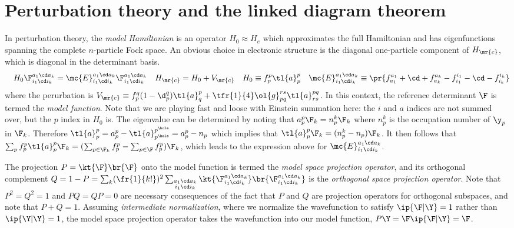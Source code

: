 \documentclass[11pt,fleqn]{article}
\numberwithin{equation}{section}
\begin{document}
\section{Perturbation theory and the linked diagram theorem}\label{sec:rspt}

\begin{dfn}\label{dfn:model-hamiltonian}
In perturbation theory, the \textit{model Hamiltonian} is an operator $H_0\approx H_e$ which approximates the full Hamiltonian and has eigenfunctions spanning the complete $n$-particle Fock space.
An obvious choice in electronic structure is the diagonal one-particle component of $H_\mr{c}$, which is diagonal in the determinant basis.
\begin{align*}
&&
  H_0
  \F_{i_1\cd i_k}^{a_1\cd a_k}
=
  \mc{E}_{i_1\cd i_k}^{a_1\cd a_k}
  \F_{i_1\cd i_k}^{a_1\cd a_k}
&&
  H_\mr{c}
=
  H_0
+
  V_\mr{c}
&&
  H_0
\equiv
  f_p^p\tl{a}^p_p
&&
  \mc{E}_{i_1\cd i_k}^{a_1\cd a_k}
\equiv
\pr{
  f_{a_1}^{a_1}
+
  \cd
+
  f_{a_k}^{a_k}
-
  f_{i_1}^{i_1}
-
  \cd
-
  f_{i_k}^{i_k}
}
\end{align*}
where the perurbation is
$
  V_\mr{c}
\equiv
  f_p^q(1-\d_p^q)
  \tl{a}^p_q
+
  \tfr{1}{4}
  \ol{g}_{pq}^{rs}
  \tl{a}^{pq}_{rs}
$.
In this context, the reference determinant $\F$ is termed the \textit{model function}.
Note that we are playing fast and loose with Einstein summation here: the $i$ and $a$ indices are not summed over, but the $p$ index in $H_0$ is.
The eigenvalue can be determined by noting that $a^p_p\F_k=n_p^k\F_k$ where $n_p^k$ is the occupation number of $\y_p$ in $\F_k$.
Therefore $\tl{a}^p_p=a^p_p-\tl{a}^{p^\hole}_{p^\hole}=a^p_p - n_p$ which implies that $\tl{a}^p_p\F_k=(n_p^k-n_p)\F_k$.
It then follows that
$
  \sum_p
  f_p^p
  \tl{a}^p_p
  \F_k
=
(
  \sum_{p\in \F_k}
  f_p^p
-
  \sum_{p\in \F}
  f_p^p
)
\F_k
$,
which leads to the expression above for $\mc{E}_{i_1\cd i_k}^{a_1\cd a_k}$.
\end{dfn}


\begin{dfn}\label{dfn:model-function}
The projection $P=\kt{\F}\br{\F}$ onto the model function is termed the \textit{model space projection operator}, and its orthogonal complement $Q=1-P=\sum_k(\fr{1}{k!})^2\sum_{\substack{a_1\cd a_k\\i_1\cd i_k}}\kt{\F_{i_1\cd i_k}^{a_1\cd a_k}}\br{\F_{i_1\cd i_k}^{a_1\cd a_k}}$ is the \textit{orthogonal space projection operator}.
Note that $P^2=Q^2=1$ and $PQ=QP=0$ are necessary consequences of the fact that $P$ and $Q$ are projection operators for orthogonal subspaces, and note that $P+Q=1$.
Assuming \textit{intermediate normalization}, where we normalize the wavefunction to satisfy $\ip{\F|\Y}=1$ rather than $\ip{\Y|\Y}=1$, the model space projection operator takes the wavefunction into our model function, $P\Y=\F\ip{\F|\Y}=\F$.
\end{dfn}
\end{document}
